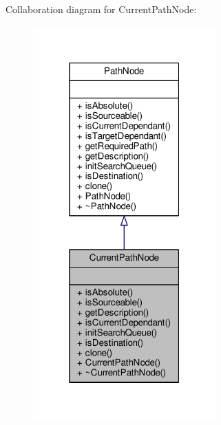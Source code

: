 Collaboration diagram for Current\+Path\+Node\+:
\nopagebreak
\begin{figure}[H]
\begin{center}
\leavevmode
\includegraphics[width=199pt]{d9/d0e/classCurrentPathNode__coll__graph}
\end{center}
\end{figure}

